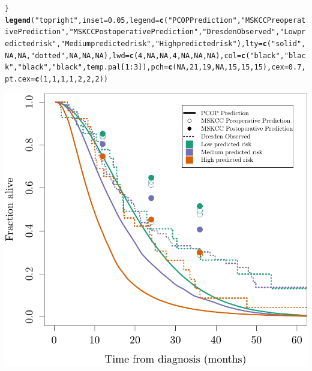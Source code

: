 \documentclass{article}\usepackage[]{graphicx}\usepackage[]{color}
\makeatletter
\def\maxwidth{ %
  \ifdim\Gin@nat@width>\linewidth
    \linewidth
  \else
    \Gin@nat@width
  \fi
}
\newcommand{\hlnum}[1]{\textcolor[rgb]{0.686,0.059,0.569}{#1}}%
\newcommand{\hlstr}[1]{\textcolor[rgb]{0.192,0.494,0.8}{#1}}%
\newcommand{\hlopt}[1]{\textcolor[rgb]{0,0,0}{#1}}%
\newcommand{\hlstd}[1]{\textcolor[rgb]{0.345,0.345,0.345}{#1}}%
\newcommand{\hlkwc}[1]{\textcolor[rgb]{0.333,0.667,0.333}{#1}}%
\newcommand{\hlkwd}[1]{\textcolor[rgb]{0.737,0.353,0.396}{\textbf{#1}}}%
\newenvironment{kframe}{%
 \def\at@end@of@kframe{}%
 \ifinner\ifhmode%
  \def\at@end@of@kframe{\end{minipage}}%
  \begin{minipage}{\columnwidth}%
 \fi\fi%
 \def\FrameCommand##1{\hskip\@totalleftmargin \hskip-\fboxsep
 \colorbox{shadecolor}{##1}\hskip-\fboxsep
     \hskip-\linewidth \hskip-\@totalleftmargin \hskip\columnwidth}%
 \MakeFramed {\advance\hsize-\width
   \@totalleftmargin\z@ \linewidth\hsize
   \@setminipage}}%
 {\par\unskip\endMakeFramed%
 \at@end@of@kframe}
\newenvironment{knitrout}{}{} %
\makeatother
\begin{document}
\begin{knitrout}
\begin{kframe}
\begin{alltt}
\hlstd{\}}
\hlkwd{legend}\hlstd{(}\hlstr{"topright"}\hlstd{,} \hlkwc{inset} \hlstd{=} \hlnum{0.05}\hlstd{,} \hlkwc{legend} \hlstd{=} \hlkwd{c}\hlstd{(}\hlstr{"PCOP Prediction"}\hlstd{,} \hlstr{"MSKCC Preoperative Prediction"}\hlstd{,} \hlstr{"MSKCC Postoperative Prediction"}\hlstd{,} \hlstr{"Dresden Observed"}\hlstd{,} \hlstr{"Low predicted risk"}\hlstd{,} \hlstr{"Medium predicted risk"}\hlstd{,} \hlstr{"High predicted risk"}\hlstd{),} \hlkwc{lty} \hlstd{=} \hlkwd{c}\hlstd{(}\hlstr{"solid"}\hlstd{,} \hlnum{NA}\hlstd{,} \hlnum{NA}\hlstd{,} \hlstr{"dotted"}\hlstd{,} \hlnum{NA}\hlstd{,} \hlnum{NA}\hlstd{,} \hlnum{NA}\hlstd{),} \hlkwc{lwd} \hlstd{=} \hlkwd{c}\hlstd{(}\hlnum{4}\hlstd{,} \hlnum{NA}\hlstd{,} \hlnum{NA}\hlstd{,} \hlnum{4}\hlstd{,} \hlnum{NA}\hlstd{,} \hlnum{NA}\hlstd{,} \hlnum{NA}\hlstd{),} \hlkwc{col} \hlstd{=} \hlkwd{c}\hlstd{(}\hlstr{"black"}\hlstd{,} \hlstr{"black"}\hlstd{,} \hlstr{"black"}\hlstd{,} \hlstr{"black"}\hlstd{, temp.pal[}\hlnum{1}\hlopt{:}\hlnum{3}\hlstd{]),} \hlkwc{pch} \hlstd{=} \hlkwd{c}\hlstd{(}\hlnum{NA}\hlstd{,} \hlnum{21}\hlstd{,} \hlnum{19}\hlstd{,} \hlnum{NA}\hlstd{,} \hlnum{15}\hlstd{,} \hlnum{15}\hlstd{,} \hlnum{15}\hlstd{),} \hlkwc{cex} \hlstd{=} \hlnum{0.7}\hlstd{,} \hlkwc{pt.cex} \hlstd{=} \hlkwd{c}\hlstd{(}\hlnum{1}\hlstd{,} \hlnum{1}\hlstd{,} \hlnum{1}\hlstd{,} \hlnum{1}\hlstd{,} \hlnum{2}\hlstd{,} \hlnum{2}\hlstd{,} \hlnum{2}\hlstd{))}
\end{alltt}
\end{kframe}

{\centering \includegraphics[width=\maxwidth]{figure/07-altman-4-dresden-1} 

}
\end{knitrout}
\end{document}
